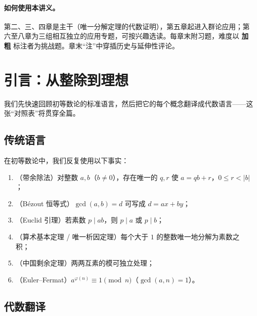 \documentclass[a4paper,11pt]{ctexart}
\numberwithin{equation}{section}
\theoremstyle{plain}
\theoremstyle{definition}
\theoremstyle{remark}
\begin{document}
\paragraph{如何使用本讲义。}第二、三、四章是主干（唯一分解定理的代数证明），第五章起进入群论应用；第六至八章为三组相互独立的应用专题，可按兴趣选读。每章末附习题，难度以 \textbf{加粗} 标注者为挑战题。章末“注”中穿插历史与延伸性评论。

\newpage

\section{引言：从整除到理想}

我们先快速回顾初等数论的标准语言，然后把它的每个概念翻译成代数语言——这张“对照表”将贯穿全篇。

\subsection{传统语言}

在初等数论中，我们反复使用以下事实：
\begin{enumerate}[itemsep=0.1em]
  \item （带余除法）对整数 $a,b$（$b\neq 0$），存在唯一的 $q,r$ 使 $a=qb+r$，$0\le r<|b|$；
  \item （Bézout 恒等式）$\gcd(a,b)=d$ 可写成 $d=ax+by$；
  \item （Euclid 引理）若素数 $p\mid ab$，则 $p\mid a$ 或 $p\mid b$；
  \item （算术基本定理 / 唯一析因定理）每个大于 $1$ 的整数唯一地分解为素数之积；
  \item （中国剩余定理）两两互素的模可独立处理；
  \item （Euler--Fermat）$a^{\varphi(n)}\equiv 1 \pmod n$（$\gcd(a,n)=1$）。
\end{enumerate}

\subsection{代数翻译}
\end{document}
